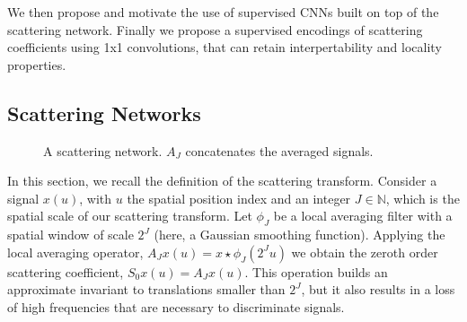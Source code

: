 \documentclass[10pt,twocolumn,letterpaper]{article}
\begin{document}
We then propose and motivate the use of  supervised CNNs built on top of the scattering network. Finally we propose a supervised encodings of scattering coefficients using 1x1 convolutions, that can retain interpertability and locality properties.






\subsection{Scattering Networks}
\label{scatnet}









\begin{figure}\begin{center}
\label{archi}


 
  

\end{center}
\caption{A scattering network. $A_J$ concatenates the averaged signals.}
\end{figure}




In this section, we recall the definition of the scattering transform. Consider a signal $x(u)$, with $u$ the spatial position index and an integer $J\in \mathbb{N}$, which is the spatial scale of our scattering transform. Let $\phi_J$ be a local averaging filter with a spatial window of scale $2^J$ (here, a Gaussian smoothing function). Applying the local averaging operator, $A_Jx(u)=x\star \phi_J(2^Ju)$ we obtain the zeroth order scattering coefficient, $S_0x(u)=A_Jx(u)$. This operation builds an approximate invariant to translations smaller than $2^J$, but it also results in a loss of high frequencies that are necessary to discriminate signals. 
\end{document}
